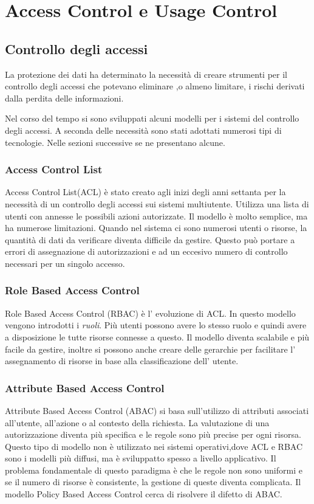 \chapter{Access Control e Usage Control}
\label{chap:Access Control e Usage Control}
\section{Controllo degli accessi}
\label{sec:Controllo degli accessi}
La protezione dei dati ha determinato la necessità di creare strumenti per il controllo degli accessi che potevano eliminare
,o almeno limitare, i rischi derivati dalla perdita delle informazioni.\par
Nel corso del tempo si sono sviluppati alcuni modelli per i sistemi del controllo degli accessi. A seconda delle necessità
sono stati adottati numerosi tipi di tecnologie\cite{NISTACM}. Nelle sezioni successive se ne presentano alcune.
\subsection{Access Control List}
\label{sub:ACL}
Access Control List(ACL) è stato creato agli inizi degli anni settanta per la necessità di un controllo degli
accessi sui sistemi multiutente.
Utilizza una lista di utenti con annesse le possibili azioni autorizzate. Il modello è molto semplice,
ma ha numerose limitazioni. Quando nel sistema ci sono numerosi utenti o risorse, la quantità di dati da verificare diventa
difficile da gestire. Questo può portare a errori di assegnazione di autorizzazioni e ad un eccesivo numero di controllo
necessari per un singolo accesso.
\subsection{Role Based Access Control}
\label{sub:RBAC}
Role Based Access Control (RBAC) è l' evoluzione di ACL. In questo modello vengono introdotti i \emph{ruoli}. Più utenti
possono avere lo stesso ruolo e quindi avere a disposizione le tutte risorse connesse a questo. Il modello
diventa scalabile e più facile da gestire, inoltre si possono anche creare delle gerarchie per facilitare l' assegnamento di
risorse in base alla classificazione dell' utente.
\subsection{Attribute Based Access Control}
\label{sub:ABAC}
Attribute Based Access Control (ABAC) si basa sull'utilizzo di attributi associati all'utente, all'azione o al contesto
della richiesta. La valutazione di una autorizzazione diventa più specifica e le regole sono più precise per ogni risorsa.
Questo tipo di modello non è utilizzato nei sistemi operativi,dove ACL e RBAC sono i modelli più diffusi, ma è sviluppatto
spesso a livello applicativo. Il problema fondamentale di questo paradigma è che le regole non sono uniformi e se il numero
di risorse è consistente, la gestione di queste diventa complicata. Il modello Policy Based Access Control cerca di
risolvere il difetto di ABAC.
